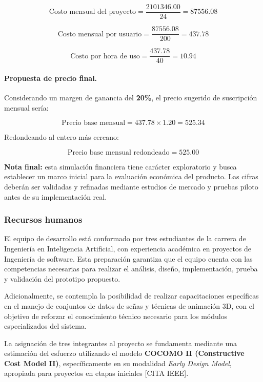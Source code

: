 \[
\text{Costo mensual del proyecto} = \frac{\num{2101346.00}}{24} = \num{87556.08}
\]

\[
\text{Costo mensual por usuario} = \frac{\num{87556.08}}{200} = \num{437.78}
\]

\[
\text{Costo por hora de uso} = \frac{\num{437.78}}{40} = \num{10.94}
\]

\paragraph{\textbf{Propuesta de precio final.}}
Considerando un margen de ganancia del \textbf{20\%}, el precio sugerido de suscripción mensual sería:

\[
\text{Precio base mensual} = \num{437.78} \times 1.20 = \num{525.34}
\]

Redondeando al entero más cercano:

\[
\text{Precio base mensual redondeado} = \num{525.00}
\]

\begin{flushleft}
	\textbf{Nota final:} esta simulación financiera tiene carácter exploratorio y busca establecer un marco inicial para la evaluación económica del producto. Las cifras deberán ser validadas y refinadas mediante estudios de mercado y pruebas piloto antes de su implementación real.
\end{flushleft}



\subsubsection{Recursos humanos}
El equipo de desarrollo está conformado por tres estudiantes de la carrera de Ingeniería en Inteligencia Artificial, con experiencia académica en proyectos de Ingeniería de software. Esta preparación garantiza que el equipo cuenta con las competencias necesarias para realizar el análisis, diseño, implementación, prueba y validación del prototipo propuesto.

Adicionalmente, se contempla la posibilidad de realizar capacitaciones específicas en el manejo de conjuntos de datos de señas y técnicas de animación 3D, con el objetivo de reforzar el conocimiento técnico necesario para los módulos especializados del sistema.

La asignación de tres integrantes al proyecto se fundamenta mediante una estimación del esfuerzo utilizando el modelo \textbf{COCOMO II (Constructive Cost Model II)}, específicamente en su modalidad \textit{Early Design Model}, apropiada para proyectos en etapas iniciales [CITA IEEE].

